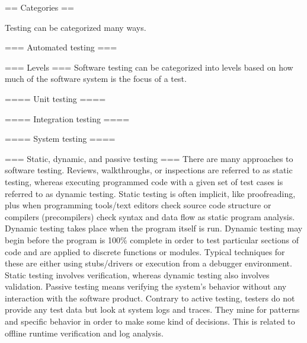 == Categories ==

Testing can be categorized many ways.


=== Automated testing ===


=== Levels ===
Software testing can be categorized into levels based on how much of the software system is the focus of a test.


==== Unit testing ====


==== Integration testing ====


==== System testing ====


=== Static, dynamic, and passive testing ===
There are many approaches to software testing. Reviews, walkthroughs, or inspections are referred to as static testing, whereas executing programmed code with a given set of test cases is referred to as dynamic testing.
Static testing is often implicit, like proofreading, plus when programming tools/text editors check source code structure or compilers (precompilers) check syntax and data flow as static program analysis. Dynamic testing takes place when the program itself is run. Dynamic testing may begin before the program is 100\% complete in order to test particular sections of code and are applied to discrete functions or modules. Typical techniques for these are either using stubs/drivers or execution from a debugger environment.
Static testing involves verification, whereas dynamic testing also involves validation.
Passive testing means verifying the system's behavior without any interaction with the software product. Contrary to active testing, testers do not provide any test data but look at system logs and traces. They mine for patterns and specific behavior in order to make some kind of decisions. This is related to offline runtime verification and log analysis.

